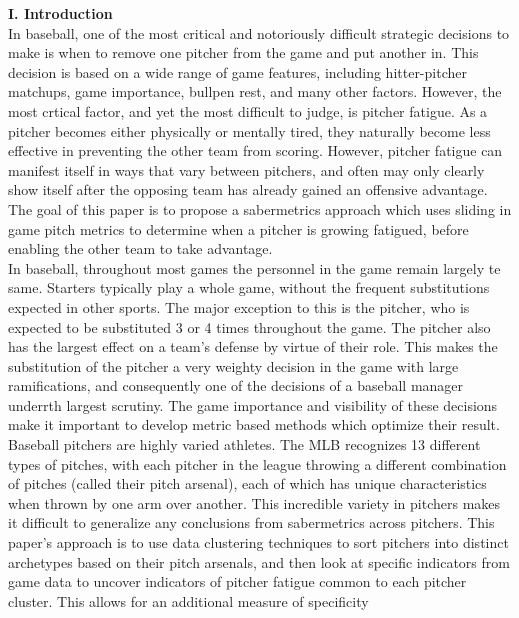 \documentclass[12 pt]{article}
\begin{document}
\pagebreak

\textbf{I. Introduction} \\

\indent In baseball, one of the most critical and notoriously difficult strategic 
decisions to make is when to remove one pitcher from the game and put another in.
This decision is based on a wide range of game features, including hitter-pitcher 
matchups, game importance, bullpen rest, and many other factors. However, the most 
crtical factor, and yet the most difficult to judge, is pitcher fatigue. As a pitcher 
becomes either physically or mentally tired, they naturally become less effective
in preventing the other team from scoring. However, pitcher fatigue can manifest itself in ways 
that vary between pitchers, and often may only clearly show itself after the opposing 
team has already gained an offensive advantage. The goal of this paper is to propose 
a sabermetrics approach which uses sliding in game pitch metrics to determine when a 
pitcher is growing fatigued, before enabling the other team to take advantage.
\\ \indent In baseball, throughout most games the personnel in the game remain largely te same. 
Starters typically play a whole game, without the frequent substitutions expected 
in other sports. The major exception to this is the pitcher, who is expected to be substituted 3 or 4
times throughout the game. The pitcher also has the largest effect on a team's 
defense by virtue of their role. This makes the substitution of the pitcher 
a very weighty decision in the game with large ramifications, and consequently one of 
the decisions of a baseball manager underrth largest scrutiny. The game importance and 
visibility of these decisions make it important to develop metric based methods which 
optimize their result. 
\\ \indent Baseball pitchers are highly varied athletes. The MLB recognizes 13 
different types of pitches, with each pitcher in the league throwing a
different combination of pitches (called their pitch arsenal), each of which has 
unique characteristics when thrown by one arm over another. This incredible variety 
in pitchers makes it difficult to generalize any conclusions from sabermetrics 
across pitchers. This paper's approach is to use data clustering techniques to 
sort pitchers into distinct archetypes based on their pitch arsenals, and then 
look at specific indicators from game data to uncover indicators of pitcher fatigue 
common to each pitcher cluster. This allows for an additional measure of specificity 
\end{document}
